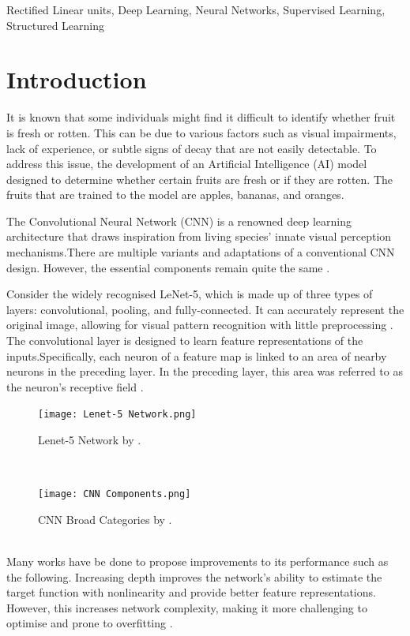 \documentclass[conference]{IEEEtran}
\begin{document}
\begin{IEEEkeywords}
Rectified Linear units, Deep Learning,
Neural Networks, Supervised Learning, Structured Learning
\end{IEEEkeywords}

\section{Introduction}

It is known that some individuals might find it difficult to identify whether fruit is fresh or rotten. This can be due to various factors such as visual impairments, lack of experience, or subtle signs of decay that are not easily detectable. To address this issue, the development of an Artificial Intelligence (AI) model designed to determine whether certain fruits are fresh or if they are rotten. The fruits that are trained to the model are apples, bananas, and oranges.

The Convolutional Neural Network (CNN) is a renowned deep learning architecture that draws inspiration from living species' innate visual perception mechanisms.There are multiple variants and adaptations of a conventional CNN design. However, the essential components remain quite the same \cite{b6}.

Consider the widely recognised LeNet-5, which is made up of three types of layers: convolutional, pooling, and fully-connected. It can accurately represent the original image, allowing for visual pattern recognition with little preprocessing \cite{b6}.
\\
The convolutional layer is designed to learn feature representations of the inputs.Specifically, each neuron of a feature map is linked to an area of nearby neurons in the preceding layer. In the preceding layer, this area was referred to as the neuron's receptive field \cite{b6}.
\\
\begin{figure}[h]
    \centering
    \texttt{[image: Lenet-5 Network.png]}
    \caption{Lenet-5 Network by \cite{b6}.}
    \label{fig}
\end{figure}
\\
\begin{figure}[h]
    \centering
    \texttt{[image: CNN Components.png]}
    \caption{CNN Broad Categories by \cite{b6}.}
    \label{fig}
\end{figure}
\\
Many works have be done to propose improvements to its performance such as the following.
Increasing depth improves the network's ability to estimate the target function with nonlinearity and provide better feature representations. However, this increases network complexity, making it more challenging to optimise and prone to overfitting \cite{b6}.
\end{document}

